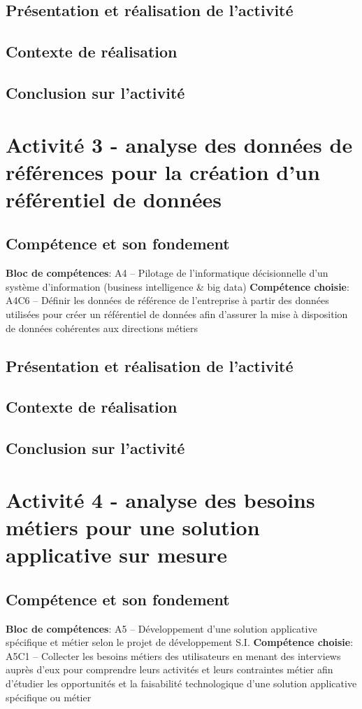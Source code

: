\documentclass[a4paper, 11pt]{report}
\begin{document}
\subsection{Présentation et réalisation de l'activité}
\subsection{Contexte de réalisation}
\subsection{Conclusion sur l'activité}

\section{Activité 3 - analyse des données de références pour la création d'un référentiel de données}
\subsection{Compétence et son fondement}
\textbf{Bloc de compétences}: A4 – Pilotage de l’informatique décisionnelle d’un système d’information (business intelligence & big data)
\newline
\textbf{Compétence choisie}: A4C6 – Définir les données de référence de l’entreprise à partir des données utilisées pour créer un référentiel de données afin d’assurer la mise à disposition de données cohérentes aux directions métiers
\subsection{Présentation et réalisation de l'activité}
\subsection{Contexte de réalisation}
\subsection{Conclusion sur l'activité}

\section{Activité 4 - analyse des besoins métiers pour une solution applicative sur mesure}
\subsection{Compétence et son fondement}
\textbf{Bloc de compétences}: A5 – Développement d’une solution applicative spécifique et métier selon le projet de développement S.I.
\newline
\textbf{Compétence choisie}: A5C1 – Collecter les besoins métiers des utilisateurs en menant des interviews auprès d’eux pour comprendre leurs activités et leurs contraintes métier afin d’étudier les opportunités et la faisabilité technologique d’une solution applicative spécifique ou métier
\end{document}
